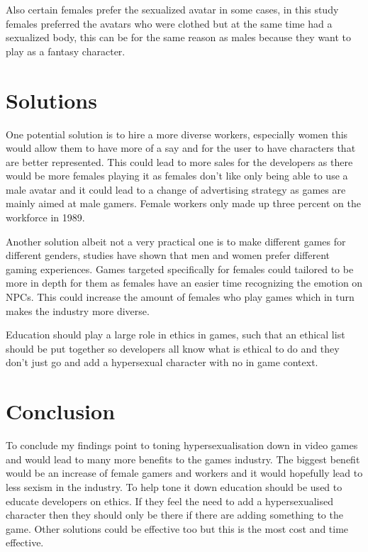 \documentclass{scrartcl}
\begin{document}
Also certain females prefer the sexualized avatar in some cases\cite{waern2005hypersexual}, in this study females preferred the avatars who were clothed but at the same time had a sexualized body, this can be for the same reason as males because they want to play as a fantasy character.

\section{Solutions}
One potential solution is to hire a more diverse workers, especially women \cite{smith2016understanding} this would allow them to have more of a say and for the user to have characters that are better represented. This could lead to more sales for the developers as there would be more females playing it as females don't like only being able to use a male avatar\cite{heron2014sexism} and it could lead to a change of advertising strategy as games are mainly aimed at male gamers\cite{waern2005hypersexual}. Female workers only made up three percent on the workforce in 1989\cite{pbs}. \newline


Another solution albeit not a very practical one is to make different games for different genders, studies have shown that men and women prefer different gaming experiences\cite{desai2016effects}. Games targeted specifically for females could tailored to be more in depth for them as females have an easier time recognizing the emotion on NPCs\cite{desai2016effects}. This could increase the amount of females who play games which in turn makes the industry more diverse. \newline


Education should play a large role in ethics in games\cite{lekka2014computer}, such that an ethical list\cite{scavarelli2014cindr} should be put together so developers all know what is ethical to do and they don't just go and add a hypersexual character with no in game context.

\section{Conclusion}
To conclude my findings point to toning hypersexualisation down in video games and would lead to many more benefits to the games industry. The biggest benefit would be an increase of female gamers and workers and it would hopefully lead to less sexism in the industry. To help tone it down education should be used to educate developers on ethics. If they feel the need to add a hypersexualised character then they should only be there if there are adding something to the game. Other solutions could be effective too but this is the most cost and time effective.



\end{document}
